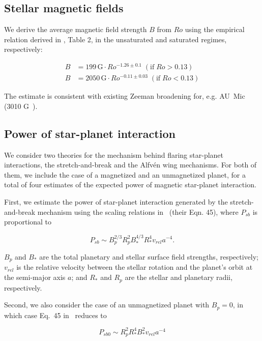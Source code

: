 \documentclass[twocolumn]{aastex631}
\begin{document}
\subsection{Stellar magnetic fields}
\label{sec:methods:bfield}
We derive the average magnetic field strength $B$ from $Ro$ using the empirical relation derived in \cite{reiners2022magnetism},  Table 2, in the unsaturated and saturated regimes, respectively:

\begin{eqnarray}
    B &= 199\,\text{G} \cdot Ro^{-1.26\pm 0.1} \;(\text{if}\; Ro > 0.13) \\
    B &= 2050\,\text{G} \cdot Ro^{-0.11\pm 0.03} \;(\text{if}\; Ro < 0.13) 
\end{eqnarray}

The estimate is consistent with existing Zeeman broadening for, e.g. AU~Mic (3010 G~\cite{reiners2022magnetism}).
\subsection{Power of star-planet interaction}
\label{sec:methods:pspi}
We consider two theories for the mechanism behind flaring star-planet interactions, the stretch-and-break and the Alfv\'en wing mechanisms. For both of them, we include the case of a magnetized and an unmagnetized planet, for a total of four estimates of the expected power of magnetic star-planet interaction.

First, we estimate the power of star-planet interaction generated by the stretch-and-break mechanism using the scaling relations in~\cite{lanza2012starplanet} (their Eqn. 45), where $P_{sb}$ is proportional to

\begin{equation}
    P_{sb} \sim B_p^{2/3} R_p^2 B_*^{4/3} R_*^4 v_{rel} a^{-4} .
\end{equation}

$B_p$ and $B_*$ are the total planetary and stellar surface field strengths, respectively; $v_{rel}$ is the relative velocity between the stellar rotation and the planet's orbit at the semi-major axis $a$; and $R_*$ and $R_p$ are the stellar and planetary radii, respectively.

Second, we also consider the case of an unmagnetized planet with $B_p=0$, in which case Eq.~45 in~\cite{lanza2012starplanet} reduces to

\begin{equation}
    P_{sb0} \sim R_p^2 R_*^4 B_*^2 v_{rel}    a^{-4} 
\end{equation}
\end{document}

